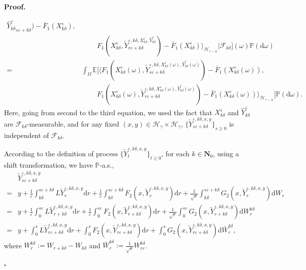 \documentclass[10pt,a4paper]{article}
\numberwithin{equation}{section}
\newenvironment{proof}[1][\normalfont\bfseries Proof]{%
	\noindent #1.\hspace{0.5em}%
	\ignorespaces%
}{%
	\hfill $\square$%
	\par%
}
\begin{document}
\begin{proof}
\begin{align*}
{		\hat{Y}^\varepsilon_{k\delta}}_{s\varepsilon+k\delta})-\bar{F}_1(X^\varepsilon_{k\delta}), \\
	&~~~~~~~~~~F_1(X^\varepsilon_{k\delta},\widetilde{Y}^{\varepsilon,k\delta,X^\varepsilon_{k\delta},
		\hat{Y}^\varepsilon_{k\delta}}_{r\varepsilon+k\delta})-
	\bar{F}_1(X^\varepsilon_{k\delta}) \big \rangle_{\mathcal H_{\gamma-\alpha}}\Big|\mathcal F_{k\delta}\Big](\omega)\mathbb P(\mathrm{d} \omega)\\
	=&\int_{\Omega}\mathbb E\Big[ \big\langle F_1(X^\varepsilon_{k\delta}(\omega),\widetilde{Y}^{\varepsilon,k\delta,X^\varepsilon_{k\delta}(\omega),
		\hat{Y}^\varepsilon_{k\delta}(\omega)}_{s\varepsilon+k\delta})-
	\bar{F}_1(X^\varepsilon_{k\delta}(\omega)),\\
	&~~~~~~~~~~ F_1(X^\varepsilon_{k\delta}(\omega),\widetilde{Y}^{\varepsilon,k\delta,X^\varepsilon_{k\delta}(\omega),
		\hat{Y}^\varepsilon_{k\delta}(\omega)}_{r\varepsilon+k\delta})-
	\bar{F}_1(X^\varepsilon_{k\delta}(\omega)) \big\rangle_{\mathcal H_{\gamma-\alpha}}\Big]\mathbb P(\mathrm{d} \omega).
\end{align*}
Here, going from second to the third equation, we used the fact that $X^\varepsilon_{k\delta}$ and $\hat{Y}^\varepsilon_{k\delta}$ are $\mathcal F_{k\delta}$-measurable, and for any fixed $(x,y)\in \mathcal H_\gamma \times \mathcal H_\gamma$, $\{\widetilde{Y}^{\varepsilon,k\delta,x,y}_{s\varepsilon+k\delta}\}_{s\geq0}$ is independent of $\mathcal F_{k\delta}$.



According to the definition of process $\{\widetilde{Y}^{\varepsilon,k\delta,
	x,y}_t\}_{t\geq0}$, for each $k\in\mathbf N_0$, using a shift transformation, we have $\mathbb P$-a.s.,
\begin{align}\label{Step3equ}
	&\widetilde{Y}^{\varepsilon,k\delta,x,y}_{s\varepsilon+k\delta}\nonumber\\
	=&y+\frac 1\varepsilon \int_{k\delta}^{s\varepsilon+k\delta} L \widetilde{Y}^{\varepsilon,k\delta,x,y}_r \mathrm{d} r+\frac 1\varepsilon\int_{k\delta}^{s\varepsilon+k\delta}F_2(x,\widetilde{Y}^{\varepsilon,k\delta,x,y}_r)\mathrm{d} r+
	\frac 1{\sqrt{\varepsilon}}\int_{k\delta}^{s\varepsilon+k\delta}G_2(x,\widetilde{Y}^{\varepsilon,k\delta,x,y}_r)\mathrm{d}W_r\nonumber\\
	=&y+\frac 1\varepsilon\int_0^{s\varepsilon} L \widetilde{Y}^{\varepsilon,k\delta,x,y}_{r+k\delta} \mathrm{d} r+\frac 1\varepsilon\int_0^{s\varepsilon}F_2(x,\widetilde{Y}^{\varepsilon,k\delta,x,y}_{r+k\delta})\mathrm{d}r+\frac 1{\sqrt{\varepsilon}}\int_0^{s\varepsilon}G_2(x,\widetilde{Y}^{\varepsilon,k\delta,x,y}_{r+k\delta})\mathrm{d}W^{k\delta}_r\nonumber\\
	=&y+\int_0^s L \widetilde{Y}^{\varepsilon,k\delta,x,y}_{r\varepsilon+k\delta}\mathrm{d}r+\int_0^s F_2(x,\widetilde{Y}^{\varepsilon,k\delta,x,y}_{r\varepsilon+k\delta})\mathrm{d}r
	+\int_0^sG_2(x,\widetilde{Y}^{\varepsilon,k\delta,x,y}_{r\varepsilon+k\delta})\mathrm{d} \bar{W}^{k\delta}_r,
\end{align}
where $W^{k\delta}_r:=W_{r+k\delta}-W_{k\delta}$ and $\bar{W}^{k\delta}_r:=\frac 1{\sqrt{\varepsilon}}W^{k\delta}_{r\varepsilon}$.




\end{proof}
\end{document}
